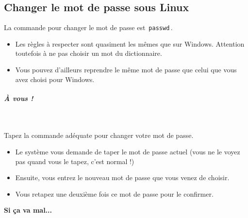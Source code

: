 \documentclass[a4paper,11pt]{article}
\begin{document}
\subsection{Changer le mot de passe sous Linux}
La commande pour changer le mot de passe est \,\verb|passwd|\,.
				
 \par
        
\begin{itemize}
				
\item Les r\`egles \`a respecter sont quasiment les m\^emes que sur Windows. Attention toutefois \`a ne pas choisir un mot du dictionnaire.
\item Vous pouvez d'ailleurs reprendre le m\^eme mot de passe que celui que vous avez choisi pour Windows. 
					
\end{itemize}
				
			
\subparagraph{\`A vous !} 
		
\textcolor{white}{.} \par
				
 \par
        
Tapez la commande ad\'equate pour changer votre mot de passe.
				
\par
        
\begin{itemize}
				
\item Le syst\`eme vous demande de taper le mot de passe actuel (vous ne le voyez pas quand vous le tapez, c'est normal !)
\item Ensuite, vous entrez le nouveau mot de passe que vous venez de choisir.
\item Vous retapez une deuxi\`eme fois ce mot de passe pour le confirmer.

\end{itemize}
\textbf{Si \c ca va mal...}
\par
        
\end{document}
